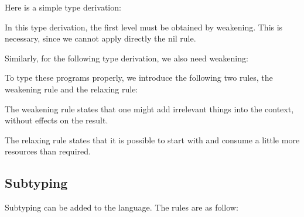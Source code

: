 \documentclass[ manuscript,screen, nonacm]{acmart}
\begin{document}
\begin{example}

  Here is a simple type derivation:
 \begin{mathpar}
 \end{mathpar}
 In this type derivation, the first level must be obtained by weakening. This is necessary, since
 we cannot apply directly the nil rule.
 
 Similarly, for the following type derivation, we also need weakening:
 \begin{mathpar}
 \end{mathpar}

\end{example}

To type these programs properly, we introduce the following two rules, the weakening rule
and the relaxing rule:
The weakening rule states that one might add irrelevant things into the context,
without effects on the result.

The relaxing rule states that it is possible to start with and consume a little more resources
than required.

\subsection{Subtyping}

Subtyping can be added to the language. The rules are as follow: 
\end{document}
